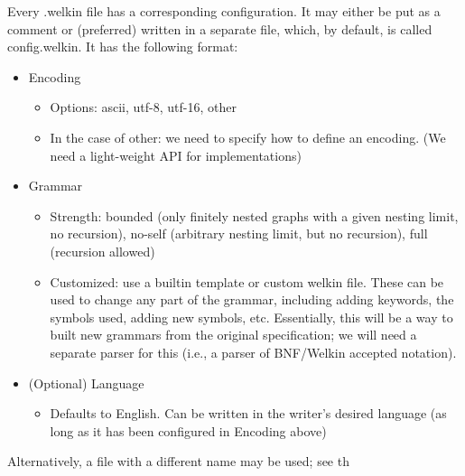 Every .welkin file has a corresponding configuration. It may either be put as a comment or (preferred) written in a separate file, which, by default, is called config.welkin. It has the following format:
\begin{itemize}
	\item Encoding
				\begin{itemize}
					\item Options: ascii, utf-8, utf-16, other
					\item In the case of other: we need to specify how to define an encoding. (We need a light-weight API for implementations)
				\end{itemize}
	\item Grammar
				\begin{itemize}
					\item Strength: bounded (only finitely nested graphs with a given nesting limit, no recursion), no-self (arbitrary nesting limit, but no recursion), full (recursion allowed)
					\item Customized: use a builtin template or custom welkin file. These can be used to change any part of the grammar, including adding keywords, the symbols used, adding new symbols, etc. Essentially, this will be a way to built new grammars from the original specification; we will need a separate parser for this (i.e., a parser of BNF/Welkin accepted notation).
				\end{itemize}

	\item (Optional) Language
				\begin{itemize}
					\item Defaults to English. Can be written in the writer's desired language (as long as it has been configured in Encoding above)
				\end{itemize}
\end{itemize}

Alternatively, a file with a different name may be used; see th



